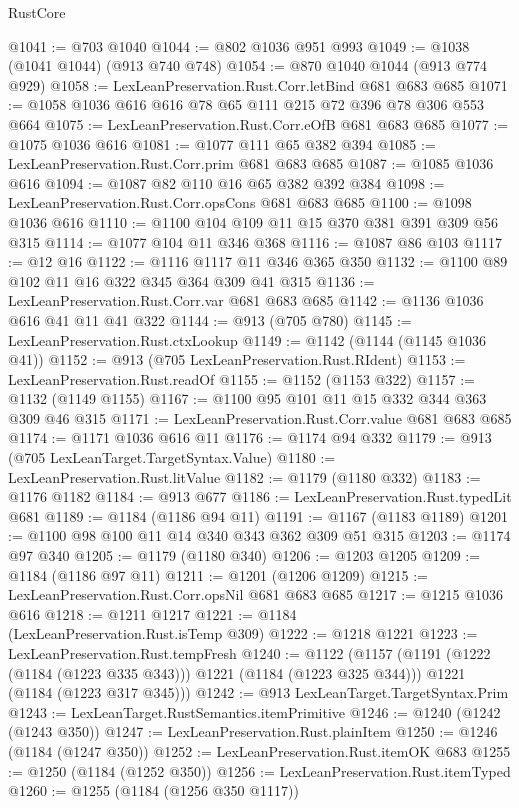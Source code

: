 \begin{lexlean}{RustCore}
\begin{coremodule}
@1041 := @703 @1040
@1044 := @802 @1036 @951 @993
@1049 := @1038 (@1041 @1044) (@913 @740 @748)
@1054 := @870 @1040 @1044 (@913 @774 @929)
@1058 := LexLeanPreservation.Rust.Corr.letBind @681 @683 @685
@1071 := @1058 @1036 @616 @616 @78 @65 @111 @215 @72 @396 @78 @306 @553 @664
@1075 := LexLeanPreservation.Rust.Corr.eOfB @681 @683 @685
@1077 := @1075 @1036 @616
@1081 := @1077 @111 @65 @382 @394
@1085 := LexLeanPreservation.Rust.Corr.prim @681 @683 @685
@1087 := @1085 @1036 @616
@1094 := @1087 @82 @110 @16 @65 @382 @392 @384
@1098 := LexLeanPreservation.Rust.Corr.opsCons @681 @683 @685
@1100 := @1098 @1036 @616
@1110 := @1100 @104 @109 @11 @15 @370 @381 @391 @309 @56 @315
@1114 := @1077 @104 @11 @346 @368
@1116 := @1087 @86 @103
@1117 := @12 @16
@1122 := @1116 @1117 @11 @346 @365 @350
@1132 := @1100 @89 @102 @11 @16 @322 @345 @364 @309 @41 @315
@1136 := LexLeanPreservation.Rust.Corr.var @681 @683 @685
@1142 := @1136 @1036 @616 @41 @11 @41 @322
@1144 := @913 (@705 @780)
@1145 := LexLeanPreservation.Rust.ctxLookup
@1149 := @1142 (@1144 (@1145 @1036 @41))
@1152 := @913 (@705 LexLeanPreservation.Rust.RIdent)
@1153 := LexLeanPreservation.Rust.readOf
@1155 := @1152 (@1153 @322)
@1157 := @1132 (@1149 @1155)
@1167 := @1100 @95 @101 @11 @15 @332 @344 @363 @309 @46 @315
@1171 := LexLeanPreservation.Rust.Corr.value @681 @683 @685
@1174 := @1171 @1036 @616 @11
@1176 := @1174 @94 @332
@1179 := @913 (@705 LexLeanTarget.TargetSyntax.Value)
@1180 := LexLeanPreservation.Rust.litValue
@1182 := @1179 (@1180 @332)
@1183 := @1176 @1182
@1184 := @913 @677
@1186 := LexLeanPreservation.Rust.typedLit @681
@1189 := @1184 (@1186 @94 @11)
@1191 := @1167 (@1183 @1189)
@1201 := @1100 @98 @100 @11 @14 @340 @343 @362 @309 @51 @315
@1203 := @1174 @97 @340
@1205 := @1179 (@1180 @340)
@1206 := @1203 @1205
@1209 := @1184 (@1186 @97 @11)
@1211 := @1201 (@1206 @1209)
@1215 := LexLeanPreservation.Rust.Corr.opsNil @681 @683 @685
@1217 := @1215 @1036 @616
@1218 := @1211 @1217
@1221 := @1184 (LexLeanPreservation.Rust.isTemp @309)
@1222 := @1218 @1221
@1223 := LexLeanPreservation.Rust.tempFresh
@1240 := @1122
    (@1157
      (@1191 (@1222 (@1184 (@1223 @335 @343))) @1221 (@1184 (@1223 @325 @344)))
      @1221
      (@1184 (@1223 @317 @345)))
@1242 := @913 LexLeanTarget.TargetSyntax.Prim
@1243 := LexLeanTarget.RustSemantics.itemPrimitive
@1246 := @1240 (@1242 (@1243 @350))
@1247 := LexLeanPreservation.Rust.plainItem
@1250 := @1246 (@1184 (@1247 @350))
@1252 := LexLeanPreservation.Rust.itemOK @683
@1255 := @1250 (@1184 (@1252 @350))
@1256 := LexLeanPreservation.Rust.itemTyped
@1260 := @1255 (@1184 (@1256 @350 @1117))

\end{coremodule}
\end{lexlean}

